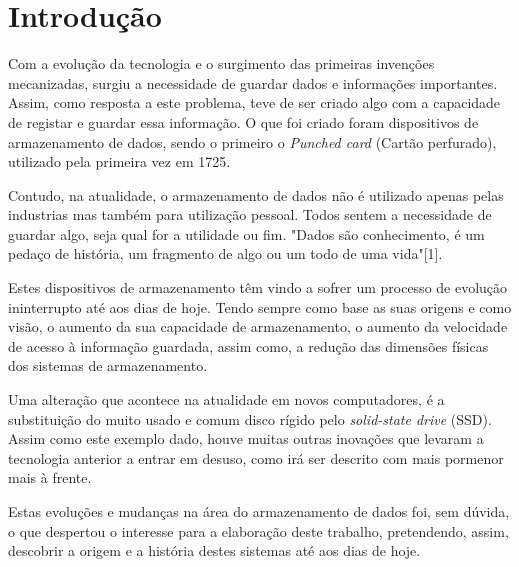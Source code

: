 \documentclass{report}
\begin{document}
\tableofcontents


\clearpage
{}

\chapter{Introdução}
\label{chap.introducao}
	Com a evolução da tecnologia e o surgimento das primeiras invenções mecanizadas, surgiu a necessidade de guardar dados e informações importantes. Assim, como resposta a este problema, teve de ser criado algo com a capacidade de registar e guardar essa informação. O que foi criado foram dispositivos de armazenamento de dados, sendo o primeiro o \textit{Punched card} (Cartão perfurado), utilizado pela primeira vez em 1725. 
\vspace{1mm}
	
	Contudo, na atualidade, o armazenamento de dados não é utilizado apenas pelas industrias mas também para utilização pessoal. Todos sentem a necessidade de guardar algo, seja qual for a utilidade ou fim. "Dados são conhecimento, é um pedaço de história, um fragmento de algo ou um todo de uma vida"[1].
\vspace{1mm}
	
	Estes dispositivos de armazenamento têm vindo a sofrer um processo de evolução ininterrupto até aos dias de hoje. Tendo sempre como base as suas origens e como visão, o aumento da sua capacidade de armazenamento, o aumento da velocidade de acesso à informação guardada, assim como, a redução das dimensões físicas dos sistemas de armazenamento.
\vspace{1mm}
	
	Uma alteração que acontece na atualidade em novos computadores, é a substituição do muito usado e comum disco rígido pelo \textit{solid-state drive} (SSD). Assim como este exemplo dado, houve muitas outras inovações que levaram a tecnologia anterior a entrar em desuso, como irá ser descrito com mais pormenor mais à frente.
\vspace{2mm}

	Estas evoluções e mudanças na área do armazenamento de dados foi, sem dúvida, o que despertou o interesse para a elaboração deste trabalho, pretendendo, assim, descobrir a origem e a história destes sistemas até aos dias de hoje.
\vspace{2mm}
\end{document}

